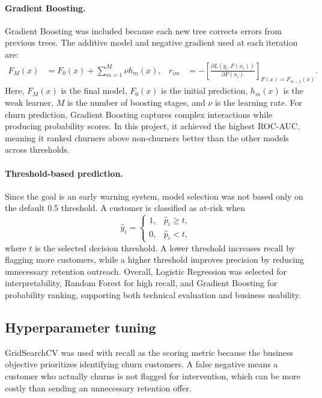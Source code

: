 \documentclass{article}
\begin{document}
\paragraph{Gradient Boosting.} Gradient Boosting was included because each new tree corrects errors from previous trees. The additive model and negative gradient used at each iteration are:
\begin{equation}
\begin{aligned}
F_M(x) &= F_0(x)+\sum_{m=1}^{M}\nu h_m(x),
& r_{im} &=
-\left[\frac{\partial L(y_i,F(x_i))}{\partial F(x_i)}\right]_{F(x)=F_{m-1}(x)}.
\end{aligned}
\end{equation}
Here, $F_M(x)$ is the final model, $F_0(x)$ is the initial prediction, $h_m(x)$ is the weak learner, $M$ is the number of boosting stages, and $\nu$ is the learning rate. For churn prediction, Gradient Boosting captures complex interactions while producing probability scores. In this project, it achieved the highest ROC-AUC, meaning it ranked churners above non-churners better than the other models across thresholds.

\paragraph{Threshold-based prediction.} Since the goal is an early warning system, model selection was not based only on the default 0.5 threshold. A customer is classified as at-risk when
\begin{equation}
\hat{y}_i=
\begin{cases}
1, & \hat{p}_i \geq t,\\
0, & \hat{p}_i < t,
\end{cases}
\end{equation}
where $t$ is the selected decision threshold. A lower threshold increases recall by flagging more customers, while a higher threshold improves precision by reducing unnecessary retention outreach. Overall, Logistic Regression was selected for interpretability, Random Forest for high recall, and Gradient Boosting for probability ranking, supporting both technical evaluation and business usability.

\subsection{Hyperparameter tuning}
GridSearchCV was used with recall as the scoring metric because the business objective prioritizes identifying churn customers. A false negative means a customer who actually churns is not flagged for intervention, which can be more costly than sending an unnecessary retention offer.
\end{document}
